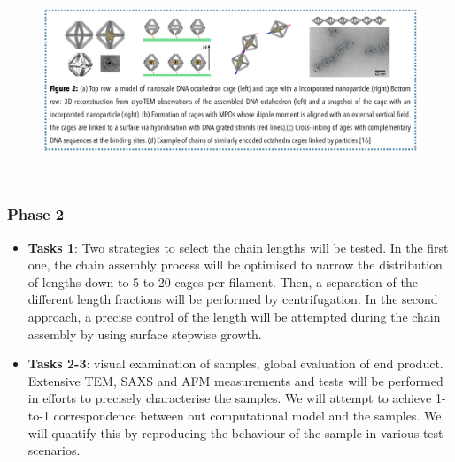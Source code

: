\documentclass{article}
\begin{document}
\begin{itemize}
    \begin{figure}[h]
\centering
  \includegraphics[height=6cm]{fig3}
\end{figure}
\end{itemize}
\subsubsection{Phase 2}
\begin{itemize}
    \item{\textbf{\textcolor{PineGreen}{Tasks 1}}: Two strategies to select the chain lengths will be tested. In the first one, the chain assembly process will be optimised to narrow the distribution of lengths down to 5 to 20 cages per filament. Then, a separation of the different length fractions will be performed by centrifugation. In the second approach, a precise control of the length will be attempted during the chain assembly by using surface stepwise growth.\cite{tian2015prescribed}}
    \item{\textbf{\textcolor{PineGreen}{Tasks 2-3}}:  visual examination of samples, global evaluation of end product. Extensive TEM, SAXS and AFM measurements and tests will be performed in efforts to precisely characterise the samples. We will attempt to achieve 1-to-1 correspondence between out computational model and the samples. We will quantify this by reproducing the behaviour of the sample in various test scenarios. }
\end{itemize}




\end{document}
